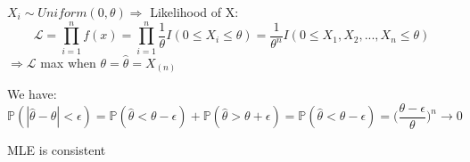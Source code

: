 \documentclass[10pt]{article}
\newenvironment{problem}[2][Problem]{\begin{trivlist}
\item[\hskip \labelsep {\bfseries #1}\hskip \labelsep {\bfseries #2.}]}{\end{trivlist}}
\begin{document}
\begin{problem}{4}


$X_i \sim Uniform(0, \theta) \Rightarrow$ Likelihood of X:
\[\mathcal{L}=\prod_{i=1}^{n}f(x)=\prod_{i=1}^{n}\frac{1}{\theta} I(0 \leq X_i \leq \theta )=\frac{1}{\theta ^n}I(0 \leq X_1, X_2,...,X_n \leq \theta)\]
$\Rightarrow \mathcal{L} $ max when $\theta= \hat{\theta}= X_{(n)}$ 

We have:
\[\mathbb{P}(|\hat{\theta}-\theta| < \epsilon) =\mathbb{P}(\hat{\theta}< \theta-\epsilon)+\mathbb{P}(\hat{\theta} > \theta + \epsilon)=\mathbb{P}(\hat{\theta} < \theta-\epsilon )=\big(\frac{\theta- \epsilon}{\theta}\big)^n \rightarrow 0\]

MLE is consistent




\end{problem}
\end{document}
